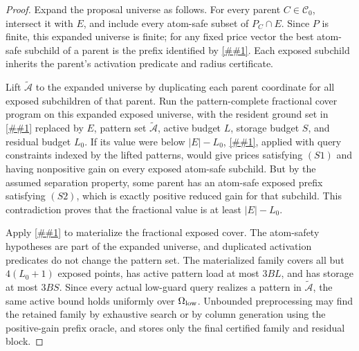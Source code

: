 \documentclass[10pt]{article}
\newcommand{\cref}[1]{\ref{##1}}
\theoremstyle{definition}
\begin{document}
\begin{proof}
   Expand the proposal universe as follows.  For every parent
   $C\in\mathcal C_0$, intersect it with $E$, and include every atom-safe
   subset of $P_C\cap E$.  Since $P$ is finite, this expanded universe is
   finite; for any fixed price vector the best atom-safe subchild of a parent
   is the prefix identified by \cref{lem:atom-safe-subchild}.  Each exposed
   subchild inherits the parent's activation predicate and radius certificate.

   Lift $\widetilde{\mathcal A}$ to the expanded universe by duplicating each
   parent coordinate for all exposed subchildren of that parent.  Run the
   pattern-complete fractional cover program on this expanded exposed universe,
   with the resident ground set in \cref{lem:pattern-complete-cover} replaced by
   $E$, pattern set $\widetilde{\mathcal A}$, active budget $L$, storage budget
   $S$, and residual budget $L_0$.  If its value were below $|E|-L_0$,
   \cref{cor:shadow-finite-pool-dual}, applied with query constraints indexed by
   the lifted patterns, would give prices satisfying \((S1)\) and having
   nonpositive gain on every exposed atom-safe subchild.  But by the assumed
   separation property, some parent has an atom-safe exposed prefix satisfying
   \((S2)\), which is exactly positive reduced gain for that subchild.  This
   contradiction proves that the fractional value is at least $|E|-L_0$.

   Apply \cref{lem:pattern-complete-cover} to materialize the fractional exposed
   cover.  The atom-safety hypotheses are part of the expanded universe, and
   duplicated activation predicates do not change the pattern set.  The
   materialized family covers all but $4(L_0+1)$ exposed points, has active
   pattern load at most $3BL$, and has storage at most $3BS$.  Since every
   actual low-guard query realizes a pattern in
   $\widetilde{\mathcal A}$, the same active bound holds uniformly over
   $\Omega_{\rm low}$.  Unbounded preprocessing may find the retained family by
   exhaustive search or by column generation using the positive-gain prefix
   oracle, and stores only the final certified family and residual block.
\end{proof}
\end{document}

